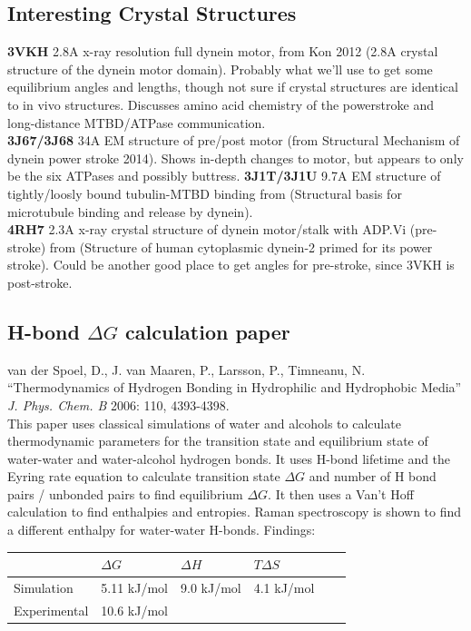 \documentclass[10pt]{article} %
\begin{document}
\subsection{Interesting Crystal Structures}
\textbf{3VKH} 2.8A x-ray resolution full dynein motor, from Kon 2012 (2.8A crystal structure of the dynein motor domain). Probably what we'll use to get some equilibrium angles and lengths, though not sure if crystal structures are identical to in vivo structures. Discusses amino acid chemistry of the powerstroke and long-distance MTBD/ATPase communication.\\
\textbf{3J67/3J68} 34A EM structure of pre/post motor (from Structural Mechanism of dynein power stroke 2014). Shows in-depth changes to motor, but appears to only be the six ATPases and possibly buttress.
\textbf{3J1T/3J1U} 9.7A EM structure of tightly/loosly bound tubulin-MTBD binding from (Structural basis for microtubule binding and release by dynein).\\
\textbf{4RH7} 2.3A x-ray crystal structure of dynein motor/stalk with ADP.Vi (pre-stroke) from (Structure of human cytoplasmic dynein-2 primed for its power stroke). Could be another good place to get angles for pre-stroke, since 3VKH is post-stroke.\\

\subsection{H-bond $\Delta G$ calculation paper}
van der Spoel, D., J. van Maaren, P., Larsson, P., Timneanu, N. ``Thermodynamics of Hydrogen Bonding in Hydrophilic and Hydrophobic Media'' \textit{J. Phys. Chem. B} 2006: 110, 4393-4398.\\

This paper uses classical simulations of water and alcohols to calculate thermodynamic parameters for the transition state and equilibrium state of water-water and water-alcohol
hydrogen bonds. It uses H-bond lifetime and the Eyring rate equation to calculate transition state $\Delta G$ and number of H bond pairs / unbonded pairs to find equilibrium
$\Delta G$. It then uses a Van't Hoff calculation to find enthalpies and entropies. Raman spectroscopy is shown to find a different enthalpy for water-water H-bonds. Findings:

\begin{center}
  \begin{tabular}{| l | l | l | l | l | l |}
    \hline
    & $\Delta G$ & $\Delta H$ & $T\Delta S$ \\\hline
    Simulation & 5.11 kJ/mol & 9.0 kJ/mol & 4.1 kJ/mol\\ \hline
    Experimental & 10.6 kJ/mol & & \\ \hline
  \end{tabular}
\end{center}
\end{document}
